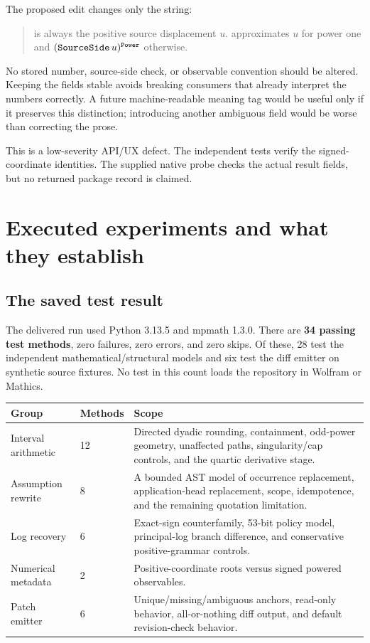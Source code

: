 \documentclass[11pt,letterpaper]{article}
\newcommand{\code}[1]{\texttt{\detokenize{#1}}}
\begin{document}
The proposed edit changes only the string:
\begin{quote}
\small
\code{LocalRoot} is always the positive source displacement $u$.
\code{LocalApproximation} approximates $u$ for power one and $(\code{SourceSide}\,u)^{\code{Power}}$ otherwise.
\end{quote}

No stored number, source-side check, or observable convention should be altered. Keeping the fields stable avoids breaking consumers that already interpret the numbers correctly. A future machine-readable meaning tag would be useful only if it preserves this distinction; introducing another ambiguous field would be worse than correcting the prose.

This is a low-severity API/UX defect. The independent tests verify the signed-coordinate identities. The supplied native probe checks the actual result fields, but no returned package record is claimed.

\section{Executed experiments and what they establish}
\label{sec:evidence}
\subsection{The saved test result}

The delivered run used Python 3.13.5 and mpmath 1.3.0. There are \textbf{34 passing test methods}, zero failures, zero errors, and zero skips. Of these, 28 test the independent mathematical/structural models and six test the diff emitter on synthetic source fixtures. No test in this count loads the repository in Wolfram or Mathics.

\begin{tabularx}{\textwidth}{@{}P{1.55in}P{0.62in}Y@{}}
\toprule
Group & Methods & Scope\\\midrule
Interval arithmetic & 12 & Directed dyadic rounding, containment, odd-power geometry, unaffected paths, singularity/cap controls, and the quartic derivative stage.\\[5pt]
Assumption rewrite & 8 & A bounded AST model of occurrence replacement, application-head replacement, scope, idempotence, and the remaining quotation limitation.\\[5pt]
Log recovery & 6 & Exact-sign counterfamily, 53-bit policy model, principal-log branch difference, and conservative positive-grammar controls.\\[5pt]
Numerical metadata & 2 & Positive-coordinate roots versus signed powered observables.\\[5pt]
Patch emitter & 6 & Unique/missing/ambiguous anchors, read-only behavior, all-or-nothing diff output, and default revision-check behavior.\\
\bottomrule
\end{tabularx}
\end{document}
